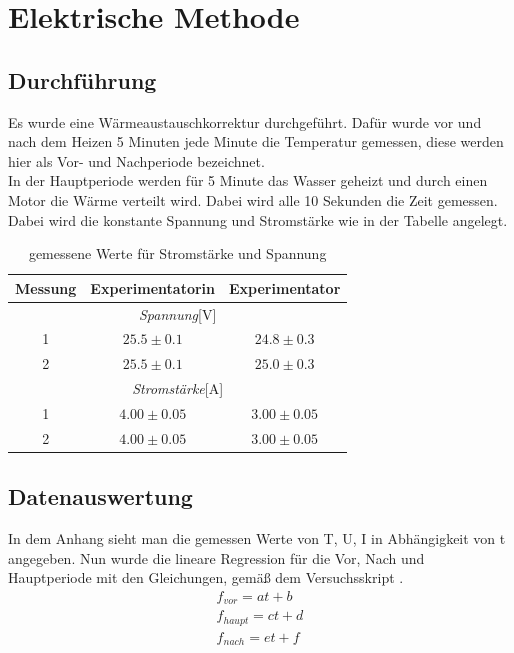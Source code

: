 \documentclass[bibliography=totocnumbered]{scrartcl}
\begin{document}
	
	\section{Elektrische Methode}
	
	\subsection{Durchführung}
	Es wurde eine Wärmeaustauschkorrektur durchgeführt. Dafür wurde vor und nach dem
	Heizen 5 Minuten jede Minute die Temperatur gemessen, diese werden hier als Vor- und
	Nachperiode bezeichnet.\\
	In der Hauptperiode werden für 5 Minute das Wasser geheizt und durch einen Motor die Wärme
	verteilt wird. Dabei wird alle 10 Sekunden die Zeit gemessen.
	Dabei wird die konstante Spannung und Stromstärke wie in der Tabelle angelegt.\\
	
	\begin{table}[ht!]
		\centering
		\caption[Spannung,Strom]{gemessene Werte für Stromstärke und Spannung}
		\begin{tabular}{|c||c|c|}
			\hline
			\textbf{Messung} & \textbf{Experimentatorin} & \textbf{Experimentator} \\
			\hline
			\hline
			\multicolumn{3}{|c|}{\textit{Spannung}[V]} \\
			\hline
			\hline
			1 & $ 25.5\pm0.1 $ & $ 24.8\pm0.3 $ \\
			\hline
			2 & $ 25.5\pm 0.1 $ & $ 25.0 \pm0.3 $\\
			\hline\hline
			\multicolumn{3}{|c|}{\textit{Stromstärke}[A]} \\
			\hline\hline
			1 & $ 4.00\pm0.05 $ &$ 3.00\pm0.05 $  \\
			\hline
			2 & $ 4.00\pm0.05 $ & $ 3.00\pm0.05 $ \\
			\hline
		\end{tabular}
		\label{tab: Spannung, Strom}
	\end{table}
	\newpage
	\subsection{Datenauswertung}
	In dem Anhang sieht man die gemessen Werte von T, U, I in Abhängigkeit von t angegeben.
	Nun wurde die lineare Regression für die Vor, Nach und Hauptperiode mit den Gleichungen, gemäß
	dem Versuchsskript\smartcite{Muller.c} .
	\begin{align}
		f_{vor}=at+b\\
		f_{haupt}=ct+d\\
		f_{nach}=et+f
	\end{align}
	
\end{document}
